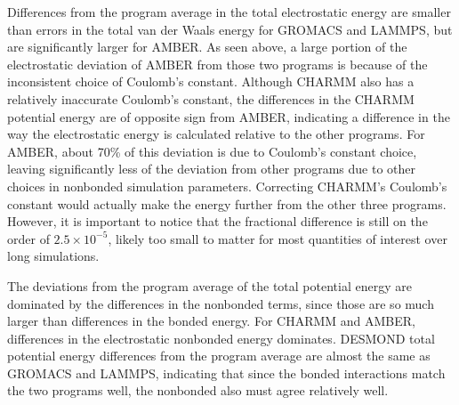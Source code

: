 Differences from the program average in the total electrostatic energy
are smaller than errors in the total van der Waals energy for GROMACS
and LAMMPS, but are significantly larger for AMBER.  As seen above, a
large portion of the electrostatic deviation of AMBER from those two
programs is because of the inconsistent choice of Coulomb's constant.
Although CHARMM also has a relatively inaccurate Coulomb's constant,
the differences in the CHARMM potential energy are of opposite sign from AMBER, indicating a difference in the way the
electrostatic energy is calculated relative to the other programs.  
For AMBER, about 70\% of this deviation is due to 
Coulomb's constant choice, leaving significantly less of the deviation
from other programs due to other choices in nonbonded simulation
parameters. Correcting CHARMM's Coulomb's constant would
actually make the energy further from the other three programs.
However, it is important to notice that the fractional difference is
still on the order of $2.5 \times 10^{-5}$, likely too small to matter
for most quantities of interest over long simulations.

The deviations from the program average of the total potential energy are
dominated by the differences in the nonbonded terms, since those are
so much larger than differences in the bonded energy.  For CHARMM and
AMBER, differences in the electrostatic nonbonded energy
dominates. DESMOND total potential energy differences from the
program average are almost the same as GROMACS and LAMMPS, indicating
that since the bonded interactions match the two programs well, the
nonbonded also must agree relatively well.

